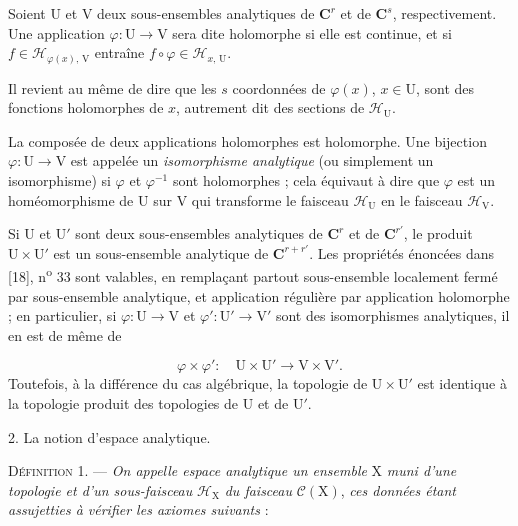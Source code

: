 Soient $\mathrm{U}$ et $\mathrm{V}$ deux sous-ensembles analytiques de $\mathbf{C}^r$ et de $\mathbf{C}^s$, respectivement. Une application $\varphi : \mathrm{U} \to \mathrm{V}$ sera dite holomorphe si elle est continue, et si $f \in \mathcal{H}_{\varphi(x),\,\mathrm{V}}$ entraîne $f \circ \varphi \in \mathcal{H}_{x,\,\mathrm{U}}$.



Il revient au même de dire que les $s$ coordonnées de $\varphi(x)$, $x \in \mathrm{U}$, sont des fonctions holomorphes de $x$, autrement dit des sections de $\mathcal{H}_{\mathrm{U}}$.

La composée de deux applications holomorphes est holomorphe. Une bijection $\varphi : \mathrm{U} \to \mathrm{V}$ est appelée un \emph{isomorphisme analytique} (ou simplement un isomorphisme) si $\varphi$ et $\varphi^{-1}$ sont holomorphes ; cela équivaut à dire que $\varphi$ est un homéomorphisme de $\mathrm{U}$ sur $\mathrm{V}$ qui transforme le faisceau $\mathcal{H}_{\mathrm{U}}$ en le faisceau $\mathcal{H}_{\mathrm{V}}$.

Si $\mathrm{U}$ et $\mathrm{U}'$ sont deux sous-ensembles analytiques de $\mathbf{C}^r$ et de $\mathbf{C}^{r'}$, le produit $\mathrm{U} \times \mathrm{U}'$ est un sous-ensemble analytique de $\mathbf{C}^{r+r'}$. Les propriétés énoncées dans [18], n\textsuperscript{o} 33 sont valables, en remplaçant partout sous-ensemble localement fermé par sous-ensemble analytique, et application régulière par application holomorphe ; en particulier, si $\varphi : \mathrm{U} \to \mathrm{V}$ et $\varphi' : \mathrm{U}' \to \mathrm{V}'$ sont des isomorphismes analytiques, il en est de même de

\begin{equation*}
\varphi \times \varphi' : \quad \mathrm{U} \times \mathrm{U}' \to \mathrm{V} \times \mathrm{V}'.
\end{equation*}
Toutefois, à la différence du cas algébrique, la topologie de $\mathrm{U} \times \mathrm{U}'$ est identique à la topologie produit des topologies de $\mathrm{U}$ et de $\mathrm{U}'$.


2. La notion d'espace analytique.

\textsc{Définition} 1. — \emph{On appelle espace analytique un ensemble} $\mathrm{X}$ \emph{muni d'une topologie et d'un sous-faisceau} $\mathcal{H}_{\mathrm{X}}$ \emph{du faisceau} $\mathcal{C}(\mathrm{X})$, \emph{ces données étant assujetties à vérifier les axiomes suivants} :

